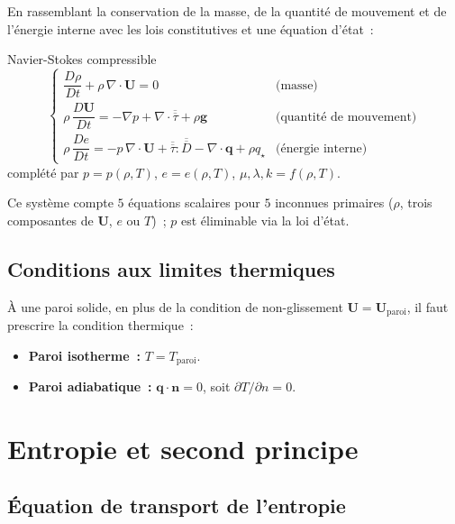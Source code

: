 \documentclass[11pt,a4paper]{report}
\newcommand{\DD}[1]{\dfrac{D #1}{Dt}}
\newcommand{\ten}[1]{\overline{\overline{#1}}}   %
\begin{document}
En rassemblant la conservation de la masse, de la quantit\'e de mouvement et de
l'\'energie interne avec les lois constitutives et une \'equation d'\'etat~:

\begin{importantbox}{Navier-Stokes compressible}
\[
  \begin{cases}
    \displaystyle\DD{\rho} + \rho\,\nabla\cdot\bm{U} = 0
    & \text{(masse)} \\[6pt]
    \displaystyle\rho\,\DD{\bm{U}} = -\nabla p + \nabla\cdot\ten{\tau} + \rho\bm{g}
    & \text{(quantit\'e de mouvement)} \\[6pt]
    \displaystyle\rho\,\DD{e} = -p\,\nabla\cdot\bm{U} + \ten{\tau}:\ten{D}
                                - \nabla\cdot\bm{q} + \rho q_\star
    & \text{(\'energie interne)}
  \end{cases}
\]
compl\'et\'e par $p = p(\rho,T)$, $e = e(\rho,T)$, $\mu,\lambda,k = f(\rho,T)$.
\end{importantbox}

Ce syst\`eme compte $5$ \'equations scalaires pour $5$ inconnues primaires ($\rho$, trois
composantes de $\bm{U}$, $e$ ou $T$)~; $p$ est \'eliminable via la loi d'\'etat.

\subsection{Conditions aux limites thermiques}

\`A une paroi solide, en plus de la condition de non-glissement
$\bm{U} = \bm{U}_{\mathrm{paroi}}$, il faut prescrire la condition thermique~:
\begin{itemize}
  \item \textbf{Paroi isotherme~:} $T = T_{\mathrm{paroi}}$.
  \item \textbf{Paroi adiabatique~:} $\bm{q}\cdot\bm{n} = 0$,
        soit $\partial T/\partial n = 0$.
\end{itemize}

\section{Entropie et second principe}

\subsection{\'Equation de transport de l'entropie}
\end{document}
